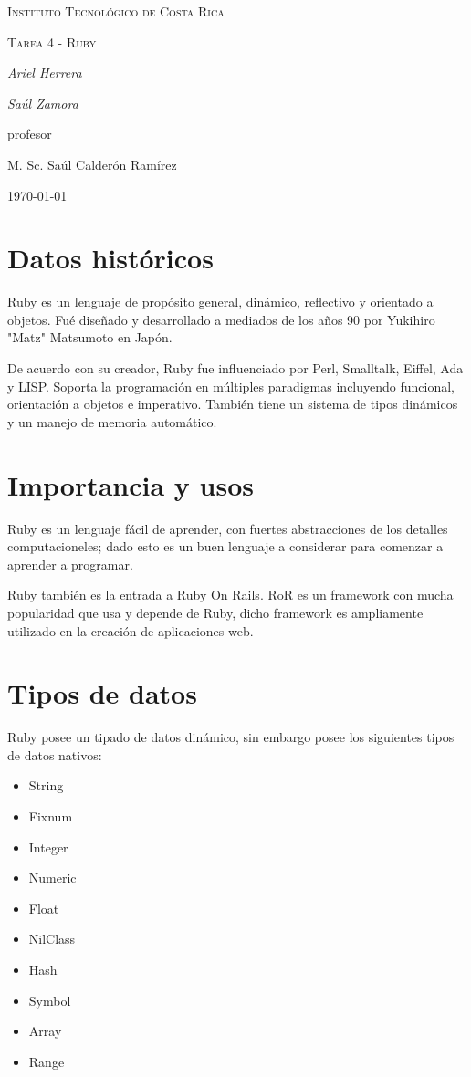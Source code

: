 \documentclass{IEEEtran}
\begin{document}
\begin{titlepage}
  \centering
  {\scshape\LARGE Instituto Tecnol\'ogico de Costa Rica \par}
  \vspace{1cm}
  {\scshape\Large Tarea 4 - Ruby\par}
  \vspace{1.5cm}
  {\Large\itshape Ariel Herrera\par}
  {\Large\itshape Sa\'ul Zamora\par}
  \vfill
  profesor\par
  M. Sc. Sa\'ul Calder\'on Ram\'irez \textsc{}

  \vfill

  {\large \today\par}
\end{titlepage}

\section{Datos hist\'oricos}
Ruby es un lenguaje de prop\'osito general, din\'amico, reflectivo y orientado a objetos. Fu\'e dise\~nado y desarrollado a mediados de los a\~nos 90 por Yukihiro "Matz" Matsumoto en Jap\'on.

De acuerdo con su creador, Ruby fue influenciado por Perl, Smalltalk, Eiffel, Ada y LISP. Soporta la programaci\'on en m\'ultiples paradigmas incluyendo funcional, orientaci\'on a objetos e imperativo. Tambi\'en tiene un sistema de tipos din\'amicos y un manejo de memoria autom\'atico.

\section{Importancia y usos}
Ruby es un lenguaje f\'acil de aprender, con fuertes abstracciones de los detalles computacioneles; dado esto es un buen lenguaje a considerar para comenzar a aprender a programar.

Ruby tambi\'en es la entrada a Ruby On Rails. RoR es un framework con mucha popularidad que usa y depende de Ruby, dicho framework es ampliamente utilizado en la creaci\'on de aplicaciones web.

\section{Tipos de datos}
Ruby posee un tipado de datos din\'amico, sin embargo posee los siguientes tipos de datos nativos:
\begin{itemize}
  \item String
  \item Fixnum
  \item Integer
  \item Numeric
  \item Float
  \item NilClass
  \item Hash
  \item Symbol
  \item Array
  \item Range
\end{itemize}
\end{document}
